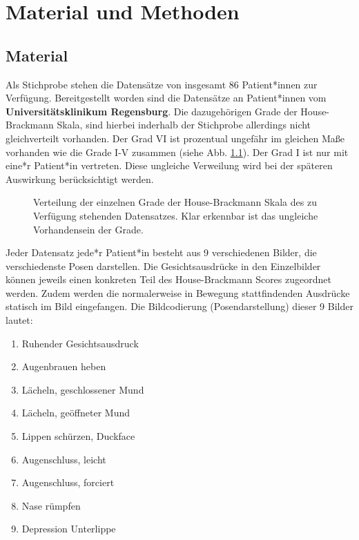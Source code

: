 \chapter{Material und Methoden}\label{mat_and_method}
\section{Material}\label{material}
Als Stichprobe stehen die Datensätze von insgesamt 86 Patient*innen zur Verfügung. Bereitgestellt worden sind die Datensätze an Patient*innen vom \textbf{Universitätsklinikum Regensburg}. Die dazugehörigen Grade der House-Brackmann Skala, sind hierbei inderhalb der Stichprobe allerdings nicht gleichverteilt vorhanden. Der Grad VI ist prozentual ungefähr im gleichen Maße vorhanden wie die Grade I-V zusammen (siehe Abb. \ref{cap:pie_grade}). Der Grad I ist nur mit eine*r Patient*in vertreten. Diese ungleiche Verweilung wird bei der späteren Auswirkung berücksichtigt werden.

\begin{figure}[!b]\centering
{}
\caption[Verteilung der einzelnen Grade der House-Brackmann Skala]{Verteilung der einzelnen Grade der House-Brackmann Skala des zu Verfügung stehenden Datensatzes. Klar erkennbar ist das ungleiche Vorhandensein der Grade.}\label{cap:pie_grade}
\end{figure}\label{fig:pie_grade}


 Jeder Datensatz jede*r Patient*in besteht aus 9 verschiedenen Bilder, die verschiedenste Posen darstellen. Die Gesichtsausdrücke in den Einzelbilder können jeweils einen konkreten Teil des House-Brackmann Scores zugeordnet werden. Zudem werden die normalerweise in Bewegung stattfindenden Ausdrücke statisch im Bild eingefangen. Die Bildcodierung (Posendarstellung) dieser 9 Bilder lautet:

\begin{enumerate}
  \setlength\itemsep{-0.6em}
\item Ruhender Gesichtsausdruck
\item Augenbrauen heben
\item Lächeln, geschlossener Mund
\item Lächeln, geöffneter Mund
\item Lippen schürzen, \glqq Duckface\grqq{}
\item Augenschluss, leicht
\item Augenschluss, forciert
\item Nase rümpfen
\item Depression Unterlippe
\end{enumerate}

